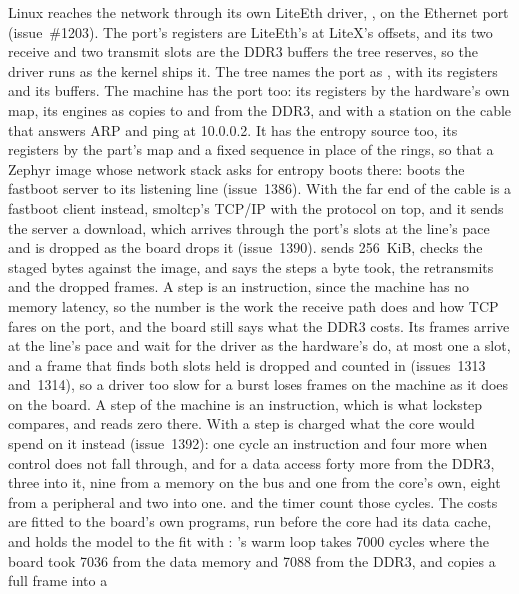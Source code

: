 \documentclass[journal,onecolumn,9pt]{IEEEtran}
\begin{document}
Linux reaches the network through its own LiteEth driver,
, on the Ethernet port (issue~\#1203). The
port's registers are LiteEth's at LiteX's offsets, and its two
receive and two transmit slots are the DDR3 buffers the tree reserves,
so the driver runs as the kernel ships it. The tree names the port as
, with its registers and its buffers. The machine
has the port too: its registers by the hardware's own map, its engines
as copies to and from the DDR3, and with  a station
on the cable that answers ARP and ping at 10.0.0.2. It has the entropy source too, its registers by the part's map and
a fixed sequence in place of the rings, so that a Zephyr image whose
network stack asks for entropy boots there: 
boots the fastboot server to its listening line (issue~1386). With  the far end of the cable is a fastboot
client instead, smoltcp's TCP/IP with the protocol on top, and it
sends the server a download, which arrives through the port's slots
at the line's pace and is dropped as the board drops it (issue~1390).
 sends 256~KiB, checks the
staged bytes against the image, and says the steps a byte took, the
retransmits and the dropped frames. A step is an instruction, since
the machine has no memory latency, so the number is the work the
receive path does and how TCP fares on the port, and the board still
says what the DDR3 costs. Its frames arrive
at the line's pace and wait for the driver as the hardware's do, at
most one a slot, and a frame that finds both slots held is dropped and
counted in  (issues~1313 and~1314), so a driver
too slow for a burst loses frames on the machine as it does on the
board.
A step of the machine is an instruction, which is what lockstep
compares, and  reads zero there. With  a
step is charged what the core would spend on it instead (issue~1392):
one cycle an instruction and four more when control does not fall
through, and for a data access forty more from the DDR3, three into
it, nine from a memory on the bus and one from the core's own, eight
from a peripheral and two into one.  and the timer count
those cycles. The costs are fitted to the board's own programs, run
before the core had its data cache, and  holds the
model to the fit with : 's warm loop
takes 7000 cycles where the board took 7036 from the data memory and
7088 from the DDR3, and  copies a full frame into a
\end{document}
